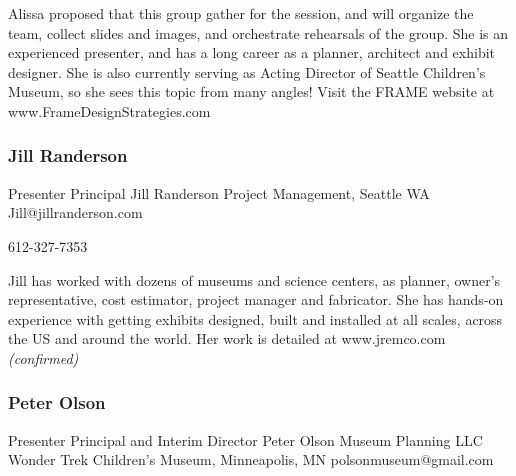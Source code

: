 \documentclass{report}
\begin{document}
              Alissa proposed that this group gather for the session, and will organize the team, collect slides and images, and orchestrate rehearsals of the group. She is an experienced presenter, and has a long career as a planner, architect and exhibit designer. She is also currently serving as Acting Director of Seattle Children’s Museum, so she sees this topic from many angles! Visit the FRAME website at www.FrameDesignStrategies.com\newline


              

              
                \subsubsection*{ Jill Randerson }
                Presenter\newline
                Principal\newline
                Jill Randerson Project Management, Seattle WA
                \newline
                Jill@jillranderson.com\newline
                
                612-327-7353\newline

                Jill has worked with dozens of museums and science centers, as planner, owner’s representative, cost estimator, project manager and fabricator. She has hands-on experience with getting exhibits designed, built and installed at all scales, across the US and around the world. Her work is detailed at www.jremco.com
                \emph{ (confirmed) }
              

              
                \subsubsection*{ Peter Olson }
                Presenter\newline
                Principal                              and                      Interim Director\newline
                Peter Olson Museum Planning LLC                     Wonder Trek Children’s Museum, Minneapolis, MN
                \newline
                polsonmuseum@gmail.com\newline
                
\end{document}

